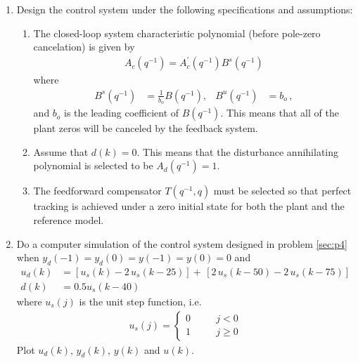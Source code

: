 \begin{enumerate}
    \item
    \label{sec:p4}
    Design the control system under the following specifications and assumptions:
    \begin{enumerate}
        \item
        The closed-loop system characteristic polynomial (before pole-zero cancelation) is given by
        \begin{align*}
            A_c (q^{-1}) = A_c^{' } (q^{-1})  B^s(q^{-1})
        \end{align*}
        where
        \begin{align*}
            B^s(q^{-1}) & = \frac{1}{b_o} B(q^{-1}),
                & B^u(q^{-1}) & = b_o\,,
        \end{align*}
        and $b_o$ is the leading coefficient of $B(q^{-1})$. This means that all of the plant zeros will be canceled by the feedback system.

        \item
        Assume that
        $d(k) = 0$. This means that the disturbance annihilating polynomial is selected to be $A_d(q^{-1}) = 1$.

        \item
        The feedforward compensator  $T(q^{-1},q)$ must be selected so that perfect tracking is achieved under a zero initial state for both the plant and the reference model.
    \end{enumerate}

    \item
    \label{sec:p5}
    Do a computer simulation of the control system designed in problem \ref{sec:p4} when $y_d(-1) = y_d(0) = y(-1) = y(0) = 0$ and
    \begin{align}
        u_d(k) & = \left [ u_s(k) - 2\,u_s(k - 25)  \right ]
            + \, \left [ 2\,u_s(k - 50) - 2\,u_s(k - 75)  \right ]
            \label{eq:uc_def} \\
        d(k) & = 0.5 u_s(k-40)
            \label{eq:d_def}
    \end{align}
    where $u_s(j)$ is the unit step function, i.e.\
    \begin{align*}
        u_s(j) = \left \{ \begin{array}{ccc}
                0 & \hspace{1em} & j < 0\\
                1 & \hspace{1em} & j \ge 0
            \end{array} \right .
    \end{align*}
    Plot $u_d(k)$, $y_d(k)$, $y(k)$ and $u(k)$.


\end{enumerate}
